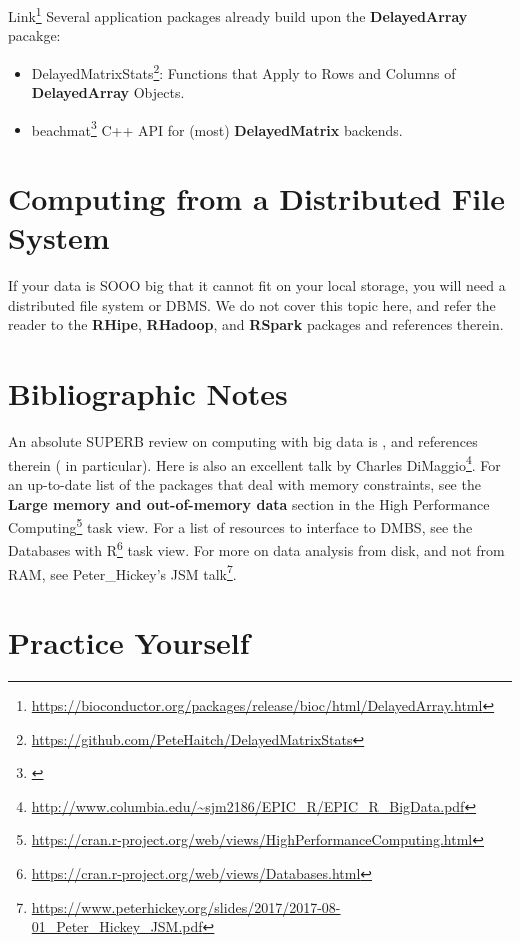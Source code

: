 \documentclass[]{book}
\providecommand{\tightlist}{%
  \setlength{\itemsep}{0pt}\setlength{\parskip}{0pt}}
\renewcommand{\href}[2]{#2\footnote{\url{#1}}}
\theoremstyle{definition}
\theoremstyle{definition}
\theoremstyle{definition}
\theoremstyle{remark}
\begin{document}
\href{https://bioconductor.org/packages/release/bioc/html/DelayedArray.html}{Link}
Several application packages already build upon the \textbf{DelayedArray} pacakge:

\begin{itemize}
\tightlist
\item
  \href{https://github.com/PeteHaitch/DelayedMatrixStats}{DelayedMatrixStats}: Functions that Apply to Rows and Columns of \textbf{DelayedArray} Objects.
\item
  \href{}{beachmat} C++ API for (most) \textbf{DelayedMatrix} backends.
\end{itemize}

\hypertarget{computing-from-a-distributed-file-system}{%
\section{Computing from a Distributed File System}\label{computing-from-a-distributed-file-system}}

If your data is SOOO big that it cannot fit on your local storage, you will need a distributed file system or DBMS.
We do not cover this topic here, and refer the reader to the \textbf{RHipe}, \textbf{RHadoop}, and \textbf{RSpark} packages and references therein.

\hypertarget{bibliographic-notes-13}{%
\section{Bibliographic Notes}\label{bibliographic-notes-13}}

An absolute SUPERB review on computing with big data is \citet{wang2015statistical}, and references therein (\citet{kane2013scalable} in particular).
Here is also an excellent talk by \href{http://www.columbia.edu/~sjm2186/EPIC_R/EPIC_R_BigData.pdf}{Charles DiMaggio}.
For an up-to-date list of the packages that deal with memory constraints, see the \textbf{Large memory and out-of-memory data} section in the \href{https://cran.r-project.org/web/views/HighPerformanceComputing.html}{High Performance Computing} task view.
For a list of resources to interface to DMBS, see the \href{https://cran.r-project.org/web/views/Databases.html}{Databases with R} task view.
For more on data analysis from disk, and not from RAM, see \href{https://www.peterhickey.org/slides/2017/2017-08-01_Peter_Hickey_JSM.pdf}{Peter\_Hickey's JSM talk}.

\hypertarget{practice-yourself-11}{%
\section{Practice Yourself}\label{practice-yourself-11}}
\end{document}
